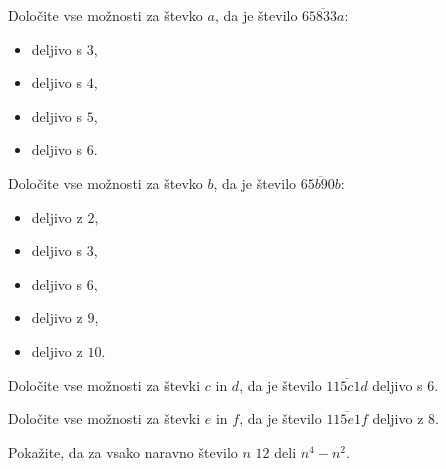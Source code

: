     
        \begin{naloga}
            Določite vse možnosti za števko $a$, da je število $\overline{65833a}$:
            \begin{itemize}
                \item deljivo s $3$, 
                \item deljivo s $4$, 
                \item deljivo s $5$, 
                \item deljivo s $6$. 
            \end{itemize}
        \end{naloga}
    

    
        \begin{naloga}
            Določite vse možnosti za števko $b$, da je število $\overline{65b90b}$:
            \begin{itemize}
                \item deljivo z $2$, 
                \item deljivo s $3$, 
                \item deljivo s $6$, 
                \item deljivo z $9$, 
                \item deljivo z $10$. 
            \end{itemize}
        \end{naloga}
    

    
        \begin{naloga}
            Določite vse možnosti za števki $c$ in $d$, da je število $\overline{115c1d}$ deljivo s $6$.
            
        \end{naloga}

        \begin{naloga}
            Določite vse možnosti za števki $e$ in $f$, da je število $\overline{115e1f}$ deljivo z $8$.
            
        \end{naloga}

    


    
        \begin{naloga}
            Pokažite, da za vsako naravno število $n$ $12$ deli $n^4-n^2$.
            
        \end{naloga}


